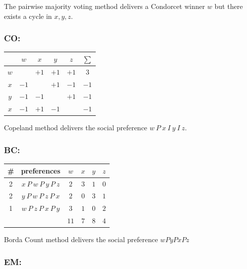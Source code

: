 \documentclass[a4paper]{article}
\begin{document}
The pairwise majority voting method delivers a Condorcet winner $w$ but there exists a cycle in $x, y, z$.

\subsubsection*{CO:}

\begin{table}[!htbp]
    \centering
    \begin{tabular}{c|c|c|c|c|c}
            & $w$  & $x$  & $y$  & $z$  & $\sum$ \\
        \hline 
        $w$ &      & $+1$ & $+1$ & $+1$ & $3$    \\
        \hline 
        $x$ & $-1$ &      & $+1$ & $-1$ & $-1$   \\
        \hline
        $y$ & $-1$ & $-1$ &      & $+1$ & $-1$   \\
        \hline
        $x$ & $-1$ & $+1$ & $-1$ &      & $-1$   \\
        \hline
    \end{tabular}
\end{table}

Copeland method delivers the social preference $w \: P \: x \: I \: y \: I \: z$.

\subsubsection*{BC:}

\begin{table}[!htbp]
    \centering
    \begin{tabular}{c|c|cccc|}
        \# & preferences                  & $w$  & $x$  & $y$  & $z$ \\ 
        \hline
        2  & $x\: P\: w\: P\: y\: P\: z$  & $2$  & $3$  & $1$  & $0$ \\
        2  & $y\: P\: w\: P\: z\: P\: x$  & $2$  & $0$  & $3$  & $1$ \\
        1  & $w\: P\: z\: P\: x\: P\: y$  & $3$  & $1$  & $0$  & $2$ \\
        \hline
           &                              & $11$ & $7$  & $8$  & $4$ \\
        \hline
    \end{tabular}
\end{table}

Borda Count method delivers the social preference $wPyPxPz$

\subsubsection*{EM:}
\end{document}
